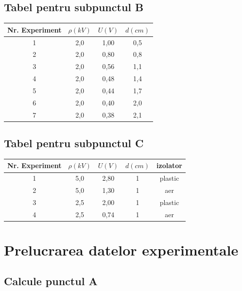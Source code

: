 \documentclass[12pt]{article}
\begin{document}
\subsection{Tabel pentru subpunctul B}

\begin{table}[h!]
    \centering
    \begin{tabular}{|c|c|c|c|}
        \hline
        Nr. Experiment & $\rho (kV)$ & $U (V)$  & $d (cm)$ \\
        \hline
        1 & 2,0 & 1,00 & 0,5 \\
        \hline
        2 & 2,0 & 0,80 & 0,8 \\
        \hline
        3 & 2,0 & 0,56 & 1,1 \\
        \hline
        4 & 2,0 & 0,48 & 1,4 \\
        \hline
        5 & 2,0 & 0,44 & 1,7 \\
        \hline
        6 & 2,0 & 0,40 & 2,0 \\
        \hline
        7 & 2,0 & 0,38 & 2,1 \\
        \hline
    \end{tabular}
\end{table}

\subsection{Tabel pentru subpunctul C}

\begin{table}[H]
    \centering
    \begin{tabular}{|c|c|c|c|c|}
        \hline
        Nr. Experiment & $\rho (kV)$ & $U (V)$  & $d (cm)$ & izolator \\
        \hline
        1 & 5,0 & 2,80 & 1 & plastic \\
        \hline
        2 & 5,0 & 1,30 & 1 & aer \\
        \hline
        3 & 2,5 & 2,00 & 1 & plastic \\
        \hline
        4 & 2,5 & 0,74 & 1 & aer\\
        \hline
    \end{tabular}
\end{table}

\section{Prelucrarea datelor experimentale}

\subsection{Calcule punctul A}
\end{document}
